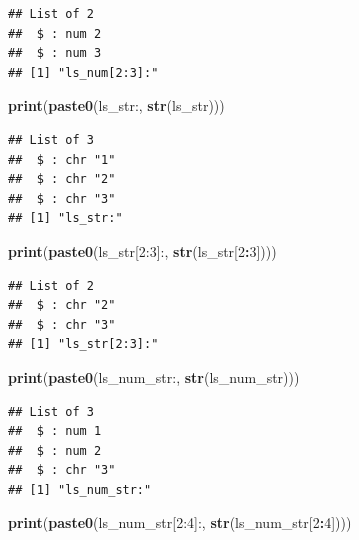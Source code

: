 \documentclass[
]{book}
\newenvironment{Shaded}{\begin{snugshade}}{\end{snugshade}}
\newcommand{\DecValTok}[1]{\textcolor[rgb]{0.00,0.00,0.81}{#1}}
\newcommand{\KeywordTok}[1]{\textcolor[rgb]{0.13,0.29,0.53}{\textbf{#1}}}
\newcommand{\NormalTok}[1]{#1}
\newcommand{\OperatorTok}[1]{\textcolor[rgb]{0.81,0.36,0.00}{\textbf{#1}}}
\newcommand{\StringTok}[1]{\textcolor[rgb]{0.31,0.60,0.02}{#1}}
\begin{document}
\begin{verbatim}
## List of 2
##  $ : num 2
##  $ : num 3
## [1] "ls_num[2:3]:"
\end{verbatim}

\begin{Shaded}
\begin{Highlighting}[]
\KeywordTok{print}\NormalTok{(}\KeywordTok{paste0}\NormalTok{(}\StringTok{\textquotesingle{}ls\_str:\textquotesingle{}}\NormalTok{, }\KeywordTok{str}\NormalTok{(ls\_str)))}
\end{Highlighting}
\end{Shaded}

\begin{verbatim}
## List of 3
##  $ : chr "1"
##  $ : chr "2"
##  $ : chr "3"
## [1] "ls_str:"
\end{verbatim}

\begin{Shaded}
\begin{Highlighting}[]
\KeywordTok{print}\NormalTok{(}\KeywordTok{paste0}\NormalTok{(}\StringTok{\textquotesingle{}ls\_str[2:3]:\textquotesingle{}}\NormalTok{, }\KeywordTok{str}\NormalTok{(ls\_str[}\DecValTok{2}\OperatorTok{:}\DecValTok{3}\NormalTok{])))}
\end{Highlighting}
\end{Shaded}

\begin{verbatim}
## List of 2
##  $ : chr "2"
##  $ : chr "3"
## [1] "ls_str[2:3]:"
\end{verbatim}

\begin{Shaded}
\begin{Highlighting}[]
\KeywordTok{print}\NormalTok{(}\KeywordTok{paste0}\NormalTok{(}\StringTok{\textquotesingle{}ls\_num\_str:\textquotesingle{}}\NormalTok{, }\KeywordTok{str}\NormalTok{(ls\_num\_str)))}
\end{Highlighting}
\end{Shaded}

\begin{verbatim}
## List of 3
##  $ : num 1
##  $ : num 2
##  $ : chr "3"
## [1] "ls_num_str:"
\end{verbatim}

\begin{Shaded}
\begin{Highlighting}[]
\KeywordTok{print}\NormalTok{(}\KeywordTok{paste0}\NormalTok{(}\StringTok{\textquotesingle{}ls\_num\_str[2:4]:\textquotesingle{}}\NormalTok{, }\KeywordTok{str}\NormalTok{(ls\_num\_str[}\DecValTok{2}\OperatorTok{:}\DecValTok{4}\NormalTok{])))}
\end{Highlighting}
\end{Shaded}
\end{document}
